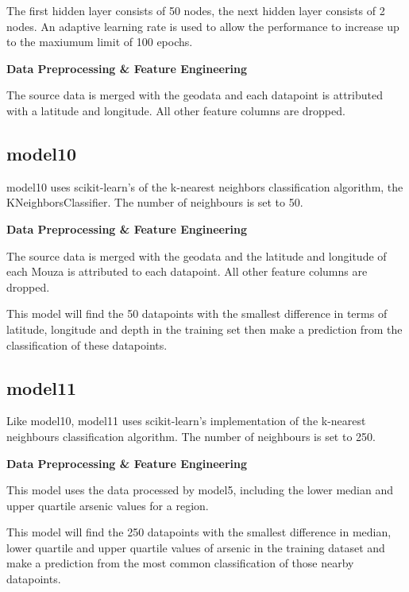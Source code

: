 The first hidden layer consists of 50 nodes, the next hidden layer consists of 2 nodes. An adaptive learning rate is used to allow the performance to increase up to the maxiumum limit of 100 epochs.

\textbf{Data Preprocessing \& Feature Engineering}

The source data is merged with the geodata and each datapoint is attributed with a latitude and longitude. All other feature columns are dropped.

\subsection{model10}

model10 uses scikit-learn's of the k-nearest neighbors classification algorithm, the KNeighborsClassifier. The number of neighbours is set to 50.

\textbf{Data Preprocessing \& Feature Engineering}

The source data is merged with the geodata and the latitude and longitude of each Mouza is attributed to each datapoint. All other feature columns are dropped.

This model will find the 50 datapoints with the smallest difference in terms of latitude, longitude and depth in the training set then make a prediction from the classification of these datapoints.

\subsection{model11}

Like model10, model11 uses scikit-learn's implementation of the k-nearest neighbours classification algorithm. The number of neighbours is set to 250.

\textbf{Data Preprocessing \& Feature Engineering}

This model uses the data processed by model5, including the lower median and upper quartile arsenic values for a region.

This model will find the 250 datapoints with the smallest difference in median, lower quartile and upper quartile values of arsenic in the training dataset and make a prediction from the most common classification of those nearby datapoints.